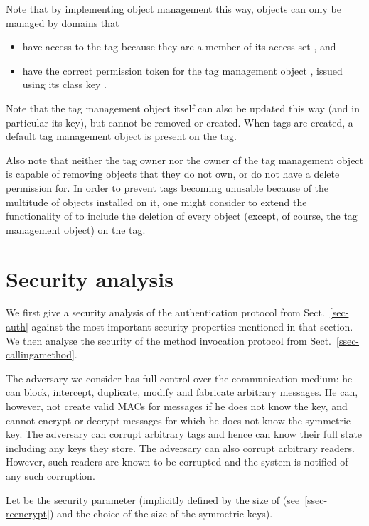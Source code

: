 Note that by implementing object management this way, objects can only be
managed by domains that 
\begin{itemize}
\fixlistspacing
\item have access to the tag because they are a member of its access set
, and
\item have the correct permission token for the tag management object ,
issued using its class key .
\end{itemize}
Note that the tag management object itself can also be updated this way (and in
particular its key), but cannot be removed or created.
When tags are created, a default tag management object is present on the tag.

Also note that neither the tag owner nor the owner of the tag management object
is capable of removing objects that they do not own, or do not have a delete permission for.
In order to prevent tags becoming unusable because of the multitude of objects installed on it,
one might consider to extend the functionality of  to include
the deletion of every object (except, of course, the tag management object) on the tag.

\section{Security analysis}
\label{sec-secanalysis}

We first give a security analysis of the authentication protocol from
Sect.~\ref{sec-auth} against the most important
security properties mentioned in that
section. We then analyse the security of the method invocation protocol
from Sect.~\ref{ssec-callingamethod}.

The adversary we consider has full control over the communication medium: he
can block, intercept, duplicate, modify and fabricate arbitrary messages. He
can, however, not create valid MACs for messages if he does not know the key,
and cannot encrypt or decrypt messages for which he does not know the symmetric
key. The adversary can corrupt arbitrary tags and hence can know their full state
including any keys they store. The adversary can also corrupt arbitrary
readers. However, such readers are known to be corrupted and the system is
notified of any such corruption.

Let  be the security parameter (implicitly defined by the size of
 (see~\ref{ssec-reencrypt}) and the choice of the size of the symmetric keys).



